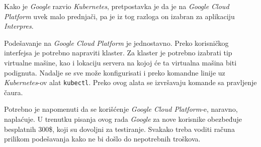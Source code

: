 Kako je \textit{Google} razvio \textit{Kubernetes}, pretpostavka je da je 
na \textit{Google Cloud Platform} uvek malo prednjači, pa je iz tog razloga 
on izabran za aplikaciju \textit{Interpres}.

Podešavanje na \textit{Google Cloud Platform} je jednostavno. Preko 
korisničkog interfejsa je potrebno napraviti klaster. Za klaster je 
potrebno izabrati tip virtualne mašine, kao i lokaciju servera na kojoj 
će ta virtualna mašina biti podignuta. Nadalje se sve može konfigurisati 
i preko komandne linije uz \textit{Kubernetes}-ov alat \texttt{kubectl}.
Preko ovog alata se izvršavaju komande sa pravljenje čaura.

Potrebno je napomenuti da se korišćenje \textit{Google Cloud Platform}-e,
naravno, naplaćuje. U trenutku pisanja ovog rada \textit{Google} za nove 
korisnike obezbeđuje besplatnih 300\$, koji su dovoljni za testiranje.
Svakako treba voditi računa prilikom podešavanja kako ne bi došlo do 
nepotrebnih troškova.

